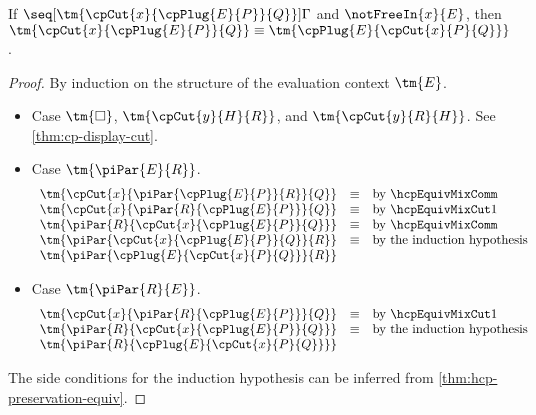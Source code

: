 \begin{lemma}\label{thm:hcp-display-cut}
  If $\seq[{ \tm{\cpCut{x}{\cpPlug{E}{P}}{Q}} }]{ \Gamma }$ and
  $\notFreeIn{x}{E}$, then $\tm{\cpCut{x}{\cpPlug{E}{P}}{Q}} \equiv
  \tm{\cpPlug{E}{\cpCut{x}{P}{Q}}}$.
\end{lemma}
\begin{proof}
  By induction on the structure of the evaluation context $\tm{E}$.
  \begin{itemize}
  \item
    Case $\tm{\Box}$, $\tm{\cpCut{y}{H}{R}}$, and $\tm{\cpCut{y}{R}{H}}$. See \cref{thm:cp-display-cut}.
  \item
    Case $\tm{\piPar{E}{R}}$.
    \begin{gather*}
      \begin{array}{lcl}
        \tm{\cpCut{x}{\piPar{\cpPlug{E}{P}}{R}}{Q}} &\equiv &\text{by }\hcpEquivMixComm \\
        \tm{\cpCut{x}{\piPar{R}{\cpPlug{E}{P}}}{Q}} &\equiv &\text{by }\hcpEquivMixCut1 \\
        \tm{\piPar{R}{\cpCut{x}{\cpPlug{E}{P}}{Q}}} &\equiv &\text{by }\hcpEquivMixComm \\
        \tm{\piPar{\cpCut{x}{\cpPlug{E}{P}}{Q}}{R}} &\equiv &\text{by the induction hypothesis}\\
        \tm{\piPar{\cpPlug{E}{\cpCut{x}{P}{Q}}}{R}} &
      \end{array}
    \end{gather*}
  \item
    Case $\tm{\piPar{R}{E}}$.
    \begin{gather*}
      \begin{array}{lcl}
        \tm{\cpCut{x}{\piPar{R}{\cpPlug{E}{P}}}{Q}} &\equiv &\text{by }\hcpEquivMixCut1 \\
        \tm{\piPar{R}{\cpCut{x}{\cpPlug{E}{P}}{Q}}} &\equiv &\text{by the induction hypothesis}\\
        \tm{\piPar{R}{\cpPlug{E}{\cpCut{x}{P}{Q}}}} &
      \end{array}
    \end{gather*}
  \end{itemize}
  The side conditions for the induction hypothesis can be inferred from
  \cref{thm:hcp-preservation-equiv}.
\end{proof}
